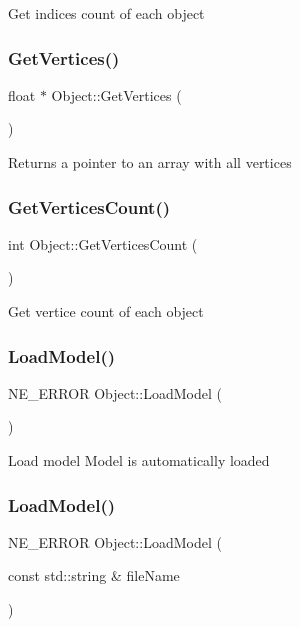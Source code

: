 Get indices count of each object \mbox{\label{class_object_af4be8aeb3118b253aa4bc9cc449d31c6}} 
\subsubsection{\texorpdfstring{GetVertices()}{GetVertices()}}
{\footnotesize\ttfamily float $\ast$ Object\+::\+Get\+Vertices (\begin{DoxyParamCaption}{ }\end{DoxyParamCaption})}

Returns a pointer to an array with all vertices \mbox{\label{class_object_abc385d340bf88ae42b73b47823ec6de4}} 
\subsubsection{\texorpdfstring{GetVerticesCount()}{GetVerticesCount()}}
{\footnotesize\ttfamily int Object\+::\+Get\+Vertices\+Count (\begin{DoxyParamCaption}{ }\end{DoxyParamCaption})}

Get vertice count of each object \mbox{\label{class_object_aebbb9ab99f56ecb88e7a84b4e24e81b9}} 
\subsubsection{\texorpdfstring{LoadModel()}{LoadModel()}\hspace{0.1cm}{\footnotesize\ttfamily [1/2]}}
{\footnotesize\ttfamily N\+E\+\_\+\+E\+R\+R\+OR Object\+::\+Load\+Model (\begin{DoxyParamCaption}{ }\end{DoxyParamCaption})}

Load model Model is automatically loaded \mbox{\label{class_object_a149a42acd59c004806d15e5dd334473f}} 
\subsubsection{\texorpdfstring{LoadModel()}{LoadModel()}\hspace{0.1cm}{\footnotesize\ttfamily [2/2]}}
{\footnotesize\ttfamily N\+E\+\_\+\+E\+R\+R\+OR Object\+::\+Load\+Model (\begin{DoxyParamCaption}\item[{const std\+::string \&}]{file\+Name }\end{DoxyParamCaption})}

